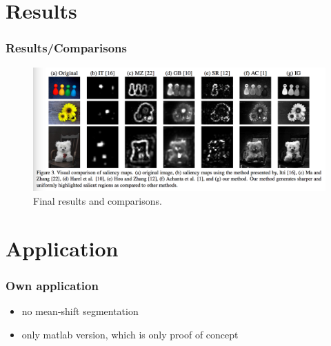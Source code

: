 \documentclass{beamer}
\begin{document}
\section{Results}

\begin{frame}
    \frametitle{Results/Comparisons}
    \begin{figure}
        \includegraphics[width=.9\textwidth]{report-images/results.png}
        \caption{Final results and comparisons\cite{achanta}.}
    \end{figure}
\end{frame}


\section{Application}

\begin{frame}
    \frametitle{Own application}
    \begin{itemize}
        \item no mean-shift segmentation
        \item only matlab version, which is only proof of concept
    \end{itemize}
\end{frame}
\end{document}
